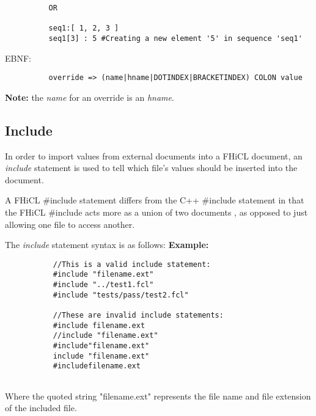 \documentclass{memarticle}
\begin{document}
{\begin{verbatim}
          OR
                                
          seq1:[ 1, 2, 3 ]
          seq1[3] : 5 #Creating a new element '5' in sequence 'seq1'
                        \end{verbatim}
                        \par
                        EBNF:
                        \begin{verbatim}
          override => (name|hname|DOTINDEX|BRACKETINDEX) COLON value
                        \end{verbatim}
                        \textbf{ Note: } the \emph{name} for an override 
                        is an \emph{hname}.
                \newpage
                \subsection{Include}
                        In order to import values from external documents into a FHiCL document,
                        an \emph{include} statement is used to tell which file's values should be inserted into the document.
                        \par
                        A FHiCL \#include statement differs from the C++ \#include statement
                        in that the FHiCL \#include acts
                        more as a union of two documents
                        , as opposed to just allowing one file to access another.
                        \par
                        The \emph{include} statement syntax is as follows:
                        \textbf{Example:}
                        \begin{verbatim}
           //This is a valid include statement:
           #include "filename.ext"
           #include "../test1.fcl"
           #include "tests/pass/test2.fcl"
                     
           //These are invalid include statements:
           #include filename.ext
           //include "filename.ext"
           #include"filename.ext"
           include "filename.ext"
           #includefilename.ext
           
                        \end{verbatim}
                        \par
                        Where the quoted string "filename.ext" represents the file name and file extension of the included file.
                        \par
}
\end{document}
